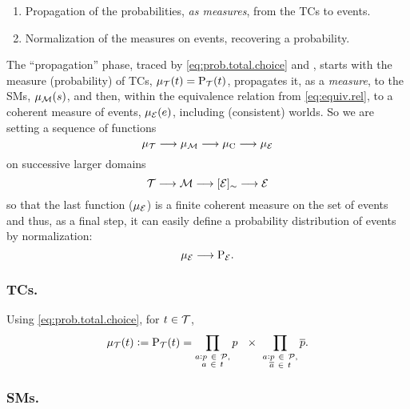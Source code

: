 \documentclass[a4paper]{article}
\newcommand{\at}[1]{\ensuremath{\!\del{#1}}}        %
\newcommand{\cla}[1]{\ensuremath{{\cal #1}}}        %
\newcommand{\co}[1]{\ensuremath{\overline{#1}}}     %
\newcommand{\PROBFset}{\ensuremath{\cla{P}}}
\newcommand{\TCHOICEset}{\ensuremath{\cla{T}}}
\newcommand{\MODELset}{\ensuremath{\cla{M}}}
\newcommand{\EVENTSset}{\ensuremath{\cla{E}}}
\newcommand{\prfunc}{\ensuremath{\mathrm{P}}}
\newcommand{\prd}[1]{\ensuremath{\prfunc_{#1}}}
\newcommand{\prT}{\prd{\TCHOICEset}}
\newcommand{\prE}{\prd{\EVENTSset}}
\newcommand{\pwT}{\ensuremath{\mu_{\TCHOICEset}}}
\newcommand{\pwt}[1]{\ensuremath{\pwT\at{#1}}}
\newcommand{\pwM}{\ensuremath{\mu_{\MODELset}}}
\newcommand{\pwm}[1]{\ensuremath{\pwM\at{#1}}}
\newcommand{\pwC}{\ensuremath{\mu_{\textrm{C}}}}
\newcommand{\pwE}{\ensuremath{\mu_{\EVENTSset}}}
\newcommand{\pwe}[1]{\ensuremath{\pwE\at{#1}}}
\newcommand{\probfact}[2]{\ensuremath{#1:#2}}
\newcommand{\class}[1]{\ensuremath{[{#1}]_{\sim}}}
\begin{document}
\begin{enumerate}
\item Propagation of the probabilities, \emph{as measures}, from the
  \aclp{TC} to events.
\item Normalization of the measures on events, recovering a
  probability.
\end{enumerate}

The ``propagation'' phase, traced by \cref{eq:prob.total.choice} and
, starts with the
measure (probability) of \aclp{TC}, \(\pwt{t} = \prT\at{t}\),
propagates it, as a \emph{measure}, to the \aclp{SM}, \(\pwm{s}\), and
then, within the equivalence relation from \cref{eq:equiv.rel}, to a
coherent measure of events, \(\pwe{e}\), including (consistent)
worlds.  So we are setting a sequence of functions
\begin{equation*}
    \pwT \longrightarrow \pwM \longrightarrow \pwC \longrightarrow \pwE
\end{equation*}
on successive larger domains
\begin{equation*}
    \TCHOICEset \longrightarrow \MODELset \longrightarrow \class{\EVENTSset} \longrightarrow \EVENTSset
\end{equation*}
so that the last function (\(\pwE\)) is a finite coherent measure on
the set of events and thus, as a final step, it can easily define a
probability distribution of events by normalization:
\begin{equation*}
    \pwE \longrightarrow \prE.
\end{equation*}


\subsubsection*{\Aclp{TC}.}

Using \cref{eq:prob.total.choice}, for \(t \in \TCHOICEset\),
\begin{equation}
    \pwt{t} := \prT\at{t}=
    \prod_{\substack{
            \probfact{a}{p}~ \in ~\PROBFset,\\
            a~ \in~ t}} p\ \ \times\
    \prod_{\substack{
            \probfact{a}{p}~ \in ~\PROBFset,\\
            \co{a}~\in~ t}} \co{p}.
    \label{eq:measure.tchoice}
\end{equation}


\subsubsection*{\Aclp{SM}.}
\end{document}
